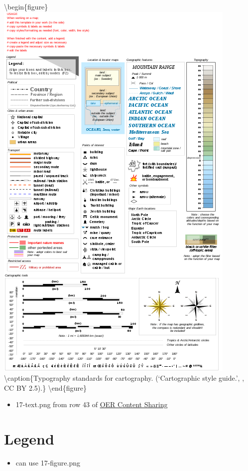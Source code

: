 \documentclass[
]{book}
\providecommand{\tightlist}{%
  \setlength{\itemsep}{0pt}\setlength{\parskip}{0pt}}
\begin{document}
\textbackslash begin\{figure\}
\includegraphics[width=0.8\linewidth]{images/17-text} \textbackslash caption\{Typography standards for cartography. (`Cartographic style guide.', \citet{gaba_cartographic_2014}, CC BY 2.5).\}\label{fig:17-text}
\textbackslash end\{figure\}

\begin{itemize}
\tightlist
\item
  17-text.png from row 43 of \href{https://docs.google.com/spreadsheets/d/1LqzXn00wMeIjHWstNT3tMImNDZirLGc3g72jFOQc_8I/edit\#gid=817407192}{OER Content Sharing}
\end{itemize}

\hypertarget{legend}{%
\section{Legend}\label{legend}}

\begin{itemize}
\tightlist
\item
  can use 17-figure.png
\end{itemize}
\end{document}
